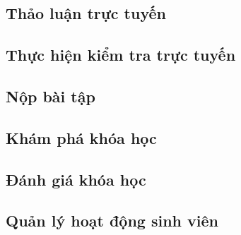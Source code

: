 \documentclass[./../main_file.tex]{subfiles}
\begin{document}
	\subsection{Thảo luận trực tuyến }
	\begin{figure}[H]
		\centering
		\resizebox{1.0\textwidth}{!}{}
	\end{figure}
	
	\subsection{Thực hiện kiểm tra trực tuyến }
	\begin{figure}[H]
		\centering
		\resizebox{1.0\textwidth}{!}{}
	\end{figure}
	
	\subsection{Nộp bài tập}
	\begin{figure}[H]
		\centering
		\resizebox{1.0\textwidth}{!}{}
	\end{figure}
	
	\subsection{Khám phá khóa học }
	\begin{figure}[H]
		\centering
		\resizebox{1.0\textwidth}{!}{}
	\end{figure}
	
	\subsection{Đánh giá khóa học}
	\begin{figure}[H]
		\centering
		\resizebox{1.0\textwidth}{!}{}
	\end{figure}
	
	\subsection{Quản lý hoạt động sinh viên }
	\begin{figure}[H]
		\centering
		\resizebox{1.0\textwidth}{!}{}
	\end{figure}
	
\end{document}
